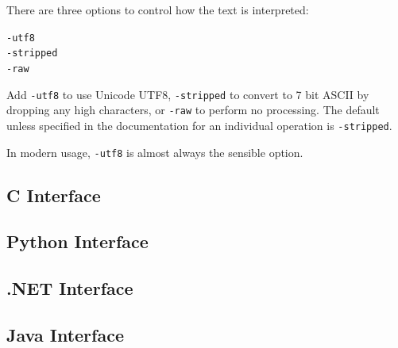 \documentclass{book}
\begin{document}
\noindent There are three options to control how the text is interpreted:

\begin{framed}
  \noindent\small\verb!-utf8!\\
  \noindent\small\verb!-stripped!\\
  \noindent\small\verb!-raw!
\end{framed}

\noindent Add \verb!-utf8! to use Unicode UTF8, \verb!-stripped! to convert to 7
bit ASCII by dropping any high characters, or \verb!-raw! to perform no
processing. The default unless specified in the documentation for an individual operation is \verb!-stripped!.

In modern usage, \texttt{-utf8} is almost always the sensible option.

\begin{cpdflib}
\clearpage
\section*{C Interface}
\begin{small}\tt


\end{small}
\end{cpdflib}

\begin{pycpdflib}
\clearpage
\section*{Python Interface}
\begin{small}\tt


\end{small}
\end{pycpdflib}

\begin{dotnetcpdflib}
\clearpage
\section*{.NET Interface}
\begin{small}\tt



\end{small}
\end{dotnetcpdflib}

\begin{jcpdflib}
\clearpage
\section*{Java Interface}
\begin{small}\tt




\end{small}
\end{jcpdflib}
\end{document}

